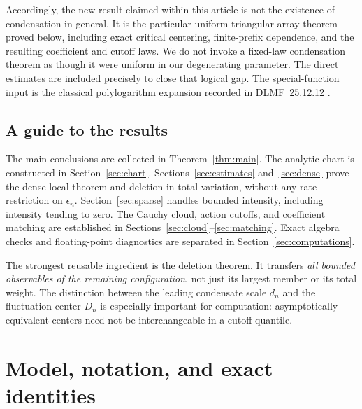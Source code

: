 \documentclass[11pt,a4paper]{article}
\numberwithin{equation}{section}
\theoremstyle{definition}
\theoremstyle{remark}
\newcommand{\ee}{\epsilon}
\begin{document}
Accordingly, the new result claimed within this article is not the
existence of condensation in general. It is the particular uniform
triangular-array theorem proved below, including exact critical centering,
finite-prefix dependence, and the resulting coefficient and cutoff laws.
We do not invoke a fixed-law condensation theorem as though it were uniform
in our degenerating parameter. The direct estimates are included precisely
to close that logical gap. The special-function input is the classical
polylogarithm expansion recorded in DLMF~25.12.12 \cite{dlmf}.

\subsection{A guide to the results}
The main conclusions are collected in Theorem~\ref{thm:main}. The analytic
chart is constructed in Section~\ref{sec:chart}. Sections~\ref{sec:estimates}
and~\ref{sec:dense} prove the dense local theorem and deletion in total
variation, without any rate restriction on $\ee_n$. Section~\ref{sec:sparse}
handles bounded intensity, including intensity tending to zero. The
Cauchy cloud, action cutoffs, and coefficient matching are established in
Sections~\ref{sec:cloud}--\ref{sec:matching}. Exact algebra checks and
floating-point diagnostics are separated in Section~\ref{sec:computations}.

The strongest reusable ingredient is the deletion theorem. It transfers
\emph{all bounded observables of the remaining configuration}, not just its
largest member or its total weight. The distinction between the leading
condensate scale $d_n$ and the fluctuation center $D_n$ is especially
important for computation: asymptotically equivalent centers need not be
interchangeable in a cutoff quantile.

\section{Model, notation, and exact identities}
\label{sec:model}
\end{document}
